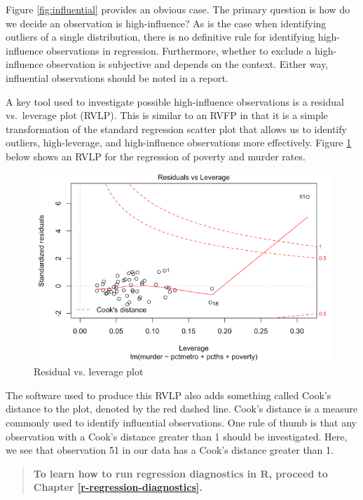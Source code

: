 \documentclass[
]{book}
\begin{document}
Figure \ref{fig:influential} provides an obvious case. The primary question is how do we decide an observation is high-influence? As is the case when identifying outliers of a single distribution, there is no definitive rule for identifying high-influence observations in regression. Furthermore, whether to exclude a high-influence observation is subjective and depends on the context. Either way, influential observations should be noted in a report.

A key tool used to investigate possible high-influence observations is a residual vs.~leverage plot (RVLP). This is similar to an RVFP in that it is a simple transformation of the standard regression scatter plot that allows us to identify outliers, high-leverage, and high-influence observations more effectively. Figure \ref{fig:rvlp} below shows an RVLP for the regression of poverty and murder rates.

\begin{figure}

{\centering \includegraphics[width=\textwidth]{images/rvlp} 

}

\caption{Residual vs. leverage plot}\label{fig:rvlp}
\end{figure}

The software used to produce this RVLP also adds something called Cook's distance to the plot, denoted by the red dashed line. Cook's distance is a measure commonly used to identify influential observations. One rule of thumb is that any observation with a Cook's distance greater than 1 should be investigated. Here, we see that observation 51 in our data has a Cook's distance greater than 1.

\begin{quote}
\textbf{To learn how to run regression diagnostics in R, proceed to Chapter \ref{r-regression-diagnostics}.}
\end{quote}
\end{document}
